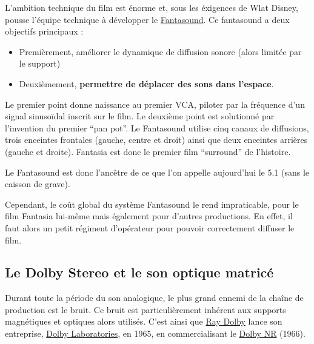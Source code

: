 \documentclass[
  letterpaper,
  DIV=11,
  numbers=noendperiod]{scrreprt}
\providecommand{\tightlist}{%
  \setlength{\itemsep}{0pt}\setlength{\parskip}{0pt}}\usepackage{longtable,booktabs,array}
\begin{document}
L'ambition technique du film est énorme et, sous les éxigences de Wlat
Disney, pousse l'équipe technique à développer le
\href{http://www.widescreenmuseum.com/sound/fantasound1.htm}{Fantasound}.
Ce fantasound a deux objectifs principaux :

\begin{itemize}
\tightlist
\item
  Premièrement, améliorer le dynamique de diffusion sonore (alors
  limitée par le support)
\item
  Deuxièmement, \textbf{permettre de déplacer des sons dans l'espace}.
\end{itemize}

Le premier point donne naissance au premier VCA, piloter par la
fréquence d'un signal sinusoïdal inscrit sur le film. Le deuxième point
est solutionné par l'invention du premier ``pan pot''. Le Fantasound
utilise cinq canaux de diffusions, trois enceintes frontales (gauche,
centre et droit) ainsi que deux enceintes arrières (gauche et droite).
Fantasia est donc le premier film ``surround'' de l'histoire.

\begin{tcolorbox}[enhanced jigsaw, leftrule=.75mm, arc=.35mm, bottomtitle=1mm, colback=white, colbacktitle=quarto-callout-note-color!10!white, opacityback=0, left=2mm, rightrule=.15mm, opacitybacktitle=0.6, breakable, toptitle=1mm, titlerule=0mm, bottomrule=.15mm, toprule=.15mm, coltitle=black, title=\textcolor{quarto-callout-note-color}{\faInfo}\hspace{0.5em}{Note}]

Le Fantasound est donc l'ancêtre de ce que l'on appelle aujourd'hui le
5.1 (sans le caisson de grave).

\end{tcolorbox}

Cependant, le coût global du système Fantasound le rend impraticable,
pour le film Fantasia lui-même mais également pour d'autres productions.
En effet, il faut alors un petit régiment d'opérateur pour pouvoir
correctement diffuser le film.

\hypertarget{le-dolby-stereo-et-le-son-optique-matricuxe9}{%
\subsection{Le Dolby Stereo et le son optique
matricé}\label{le-dolby-stereo-et-le-son-optique-matricuxe9}}

Durant toute la période du son analogique, le plus grand ennemi de la
chaîne de production est le bruit. Ce bruit est particulièrement
inhérent aux supports magnétiques et optiques alors utilisés. C'est
ainsi que \href{https://fr.wikipedia.org/wiki/Ray_Dolby}{Ray Dolby}
lance son entreprise, \href{https://fr.wikipedia.org/wiki/Dolby}{Dolby
Laboratories}, en 1965, en commercialisant le
\href{https://en.wikipedia.org/wiki/Dolby_noise-reduction_system}{Dolby
NR} (1966).
\end{document}
